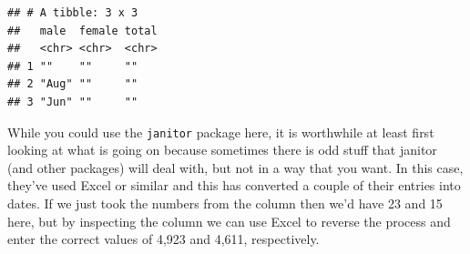 \documentclass[
]{book}
\newenvironment{Shaded}{\begin{snugshade}}{\end{snugshade}}
\newcommand{\CommentTok}[1]{\textcolor[rgb]{0.56,0.35,0.01}{\textit{#1}}}
\newcommand{\DecValTok}[1]{\textcolor[rgb]{0.00,0.00,0.81}{#1}}
\newcommand{\KeywordTok}[1]{\textcolor[rgb]{0.13,0.29,0.53}{\textbf{#1}}}
\newcommand{\NormalTok}[1]{#1}
\newcommand{\OperatorTok}[1]{\textcolor[rgb]{0.81,0.36,0.00}{\textbf{#1}}}
\newcommand{\StringTok}[1]{\textcolor[rgb]{0.31,0.60,0.02}{#1}}
\begin{document}
\begin{Shaded}
\end{Shaded}

\begin{verbatim}
## # A tibble: 3 x 3
##   male  female total
##   <chr> <chr>  <chr>
## 1 ""    ""     ""   
## 2 "Aug" ""     ""   
## 3 "Jun" ""     ""
\end{verbatim}

\begin{Shaded}
\end{Shaded}

While you could use the \texttt{janitor} package here, it is worthwhile at least first looking at what is going on because sometimes there is odd stuff that janitor (and other packages) will deal with, but not in a way that you want. In this case, they've used Excel or similar and this has converted a couple of their entries into dates. If we just took the numbers from the column then we'd have 23 and 15 here, but by inspecting the column we can use Excel to reverse the process and enter the correct values of 4,923 and 4,611, respectively.
\end{document}
